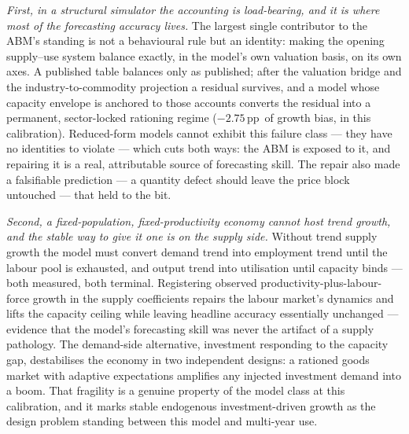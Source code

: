 \documentclass[11pt,a4paper]{article}
\newcommand{\pp}{\,pp}
\begin{document}
\emph{First, in a structural simulator the accounting is load-bearing, and it is where most of
the forecasting accuracy lives.} The largest single contributor to the ABM's standing is not a
behavioural rule but an identity: making the opening supply--use system balance exactly, in the
model's own valuation basis, on its own axes. A published table balances only as published;
after the valuation bridge and the industry-to-commodity projection a residual survives, and a
model whose capacity envelope is anchored to those accounts converts the residual into a
permanent, sector-locked rationing regime ($-2.75$\pp\ of growth bias, in this calibration).
Reduced-form models cannot exhibit this failure class --- they have no identities to violate ---
which cuts both ways: the ABM is exposed to it, and repairing it is a real, attributable source
of forecasting skill. The repair also made a falsifiable prediction --- a quantity defect should
leave the price block untouched --- that held to the bit.

\emph{Second, a fixed-population, fixed-productivity economy cannot host trend growth, and the
stable way to give it one is on the supply side.} Without trend supply growth the model must
convert demand trend into employment trend until the labour pool is exhausted, and output trend
into utilisation until capacity binds --- both measured, both terminal. Registering observed
productivity-plus-labour-force growth in the supply coefficients repairs the labour market's
dynamics and lifts the capacity ceiling while leaving headline accuracy essentially unchanged
--- evidence that the model's forecasting skill was never the artifact of a supply pathology.
The demand-side alternative, investment responding to the capacity gap, destabilises the economy
in two independent designs: a rationed goods market with adaptive expectations amplifies any
injected investment demand into a boom. That fragility is a genuine property of the model class
at this calibration, and it marks stable endogenous investment-driven growth as the design
problem standing between this model and multi-year use.
\end{document}
